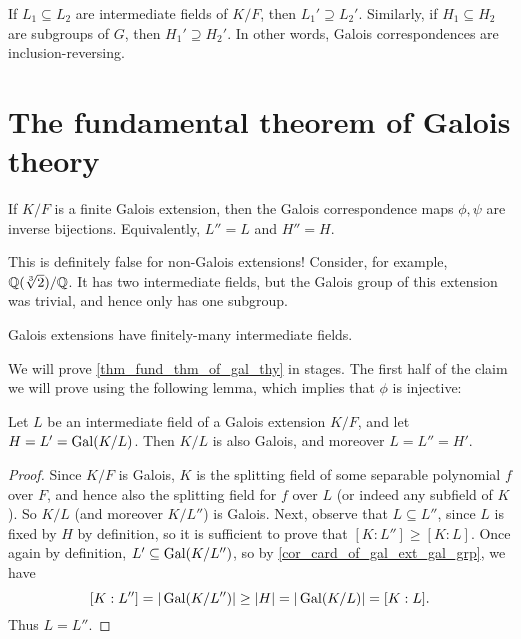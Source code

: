 \begin{proposition}
    If $L_1 \subseteq L_2$ are intermediate fields of $K/F$, then $L_1' \supseteq L_2'$. Similarly, if $H_1 \subseteq H_2$ are subgroups of $G$, then $H_1' \supseteq H_2'$. In other words, Galois correspondences are inclusion-reversing.
\end{proposition}

\section{The fundamental theorem of Galois theory}

\begin{theorem}
\label{thm_fund_thm_of_gal_thy}
    If $K/F$ is a finite Galois extension, then the Galois correspondence maps $\phi, \psi$ are inverse bijections.
   Equivalently, $L'' = L$ and $H'' = H$.
\end{theorem}

\begin{example}
\label{exmp_bad_gal_corresp}
    This is definitely false for non-Galois extensions! Consider, for example, $\mathbb{{Q}}(\sqrt[3]{2})/\mathbb{{Q}}$. It has two intermediate fields, but the Galois group of this extension was trivial, and hence only has one subgroup.
\end{example}

\begin{corollary}
    Galois extensions have finitely-many intermediate fields.
\end{corollary}

We will prove \cref{thm_fund_thm_of_gal_thy} in stages. The first half of the claim we will prove using the following lemma, which implies that $\phi$ is injective:

\begin{lemma}
\label{lem_int_field_imp_of_fund_gal_thm}
    Let $L$ be an intermediate field of a Galois extension $K/F$, and let $H = L' = \operatorname{Gal}(K/L)$. Then $K/L$ is also Galois, and moreover $L = L'' = H'$.
\end{lemma}

\begin{proof}
    Since $K/F$ is Galois, $K$ is the splitting field of some separable polynomial $f$ over $F$, and hence also the splitting field for $f$ over $L$ (or indeed any subfield of $K$). So $K/L$ (and moreover $K/L''$) is Galois. Next, observe that $L \subseteq L''$, since $L$ is fixed by $H$ by definition, so it is sufficient to prove that $[K : L''] \geq [K : L]$. Once again by definition, $L' \subseteq \operatorname{Gal}(K/L'')$, so by \cref{cor_card_of_gal_ext_gal_grp}, we have
    \[
        [K : L''] = |\operatorname{Gal}(K/L'')| \geq |H| = |\operatorname{Gal}(K/L)| = [K : L].
    \]
    Thus $L = L''$.
\end{proof}

